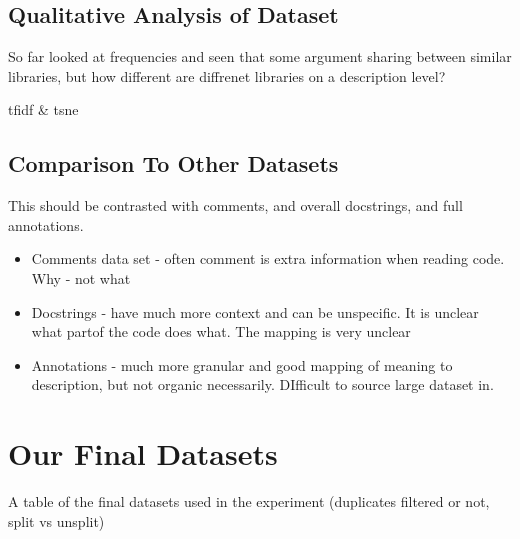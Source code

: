 
\subsection{Qualitative Analysis of Dataset} %
\label{sub:qualitative_analysis_}
So far looked at frequencies and seen that some argument sharing between similar libraries, but how different are diffrenet libraries on a description level?

tfidf \& tsne



\subsection{Comparison To Other Datasets} %
\label{sub:comparison_to_other_datasets}

    This should be contrasted with comments, and overall docstrings, and full annotations.
    \begin{itemize}
        \item Comments data set - often comment is extra information when reading code. Why - not what
        \item Docstrings - have much more context and can be unspecific. It is unclear what partof the code does what. The mapping is very unclear
        \item Annotations - much more granular and good mapping of meaning to description, but not organic necessarily. DIfficult to source large dataset in.
    \end{itemize}


\section{Our Final Datasets} %
\label{sec:our_final_datasets}

A table of the final datasets used in the experiment (duplicates filtered or not, split vs unsplit)


